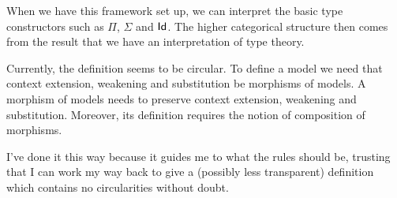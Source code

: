 When we have this framework set up, we can interpret the basic type constructors
such as $\Pi$, $\Sigma$ and $\mathsf{Id}_{}$.
The higher categorical structure then comes from the
result that we have an interpretation of type theory.

\begingroup
\color{red}
\begin{rmk}
Currently, the definition seems to be circular. To define a model we need that
context extension, weakening and substitution be morphisms of models. A morphism
of models needs to preserve context extension, weakening and substitution.
Moreover, its definition requires the notion of composition of morphisms.

I've done it this way because it guides me to what the rules should be, trusting
that I can work my way back to give a (possibly less transparent) definition
which contains no circularities without doubt.
\end{rmk}
\endgroup
